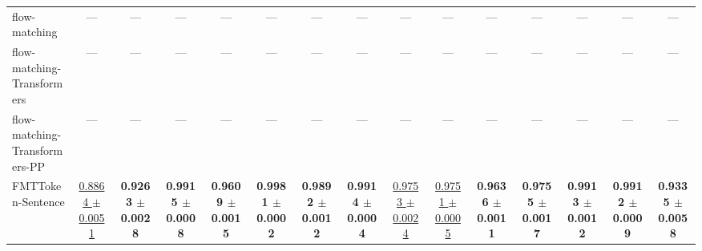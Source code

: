 \begin{table}[H]
{\begin{tabular}{lcccccccccccccc}
flow-matching & — & — & — & — & — & — & — & — & — & — & — & — & — & — \\
flow-matching-Transformers & — & — & — & — & — & — & — & — & — & — & — & — & — & — \\
flow-matching-Transformers-PP & — & — & — & — & — & — & — & — & — & — & — & — & — & — \\
FMTToken-Sentence & \underline{0.8864 $\pm$ 0.0051} & \textbf{0.9263 $\pm$ 0.0028} & \textbf{0.9915 $\pm$ 0.0008} & \textbf{0.9609 $\pm$ 0.0015} & \textbf{0.9981 $\pm$ 0.0002} & \textbf{0.9892 $\pm$ 0.0012} & \textbf{0.9914 $\pm$ 0.0004} & \underline{0.9753 $\pm$ 0.0024} & \underline{0.9751 $\pm$ 0.0005} & \textbf{0.9636 $\pm$ 0.0011} & \textbf{0.9755 $\pm$ 0.0017} & \textbf{0.9913 $\pm$ 0.0012} & \textbf{0.9912 $\pm$ 0.0009} & \textbf{0.9335 $\pm$ 0.0058} \\
\bottomrule
\end{tabular}
}
\label{tab:dbpedia14}
\end{table}

\begin{table}[H]
\centering
\caption{AUC on Sms}
\label{tab:sms}
\end{table}

